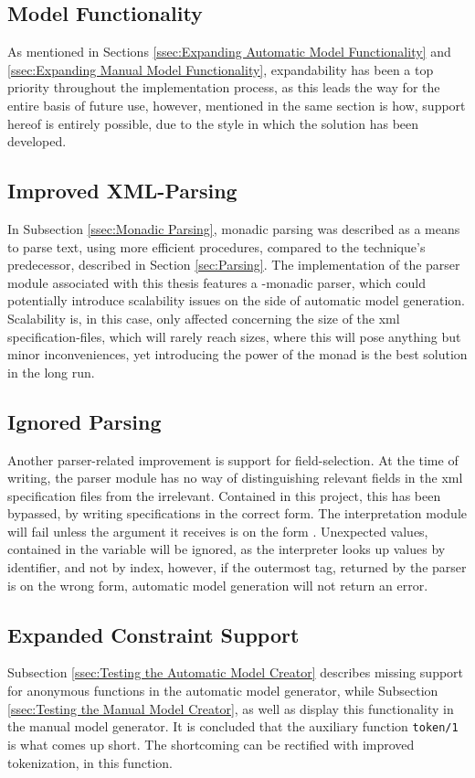 \subsection{Model Functionality}
As mentioned in Sections \ref{ssec:Expanding Automatic Model Functionality} and \ref{ssec:Expanding Manual Model Functionality}, expandability has been a top priority throughout the implementation process, as this leads the way for the entire basis of future use, however,  mentioned in the same section is how, support hereof is entirely possible, due to the style in which the solution has been developed. 
\subsection{Improved XML-Parsing}
In Subsection \ref{ssec:Monadic Parsing}, monadic parsing was described as a means to parse text, using more efficient procedures, compared to the technique's predecessor, described in Section \ref{sec:Parsing}. The implementation of the parser module associated with this thesis features a -monadic parser, which could potentially introduce scalability issues on the side of automatic model generation. Scalability is, in this case, only affected concerning the size of the xml specification-files, which will rarely reach sizes, where this will pose anything but minor inconveniences, yet introducing the power of the monad is the best solution in the long run.
\subsection{Ignored Parsing}
Another parser-related improvement is support for field-selection. At the time of writing, the parser module has no way of distinguishing relevant fields in the xml specification files from the irrelevant. Contained in this project, this has been bypassed, by writing specifications in the correct form. The interpretation module will fail unless the argument it receives is on the form . Unexpected values, contained in the  variable will be ignored, as the interpreter looks up values by identifier, and not by index, however, if the outermost tag, returned by the parser is on the wrong form, automatic model generation will not return an error.
\newpage
\subsection{Expanded Constraint Support}
Subsection \ref{ssec:Testing the Automatic Model Creator} describes missing support for anonymous functions in the automatic model generator, while Subsection \ref{ssec:Testing the Manual Model Creator}, as well as  display this functionality in the manual model generator. It is concluded that the auxiliary function \lstinline{token/1} is what comes up short. The shortcoming can be rectified with improved tokenization, in this function.
